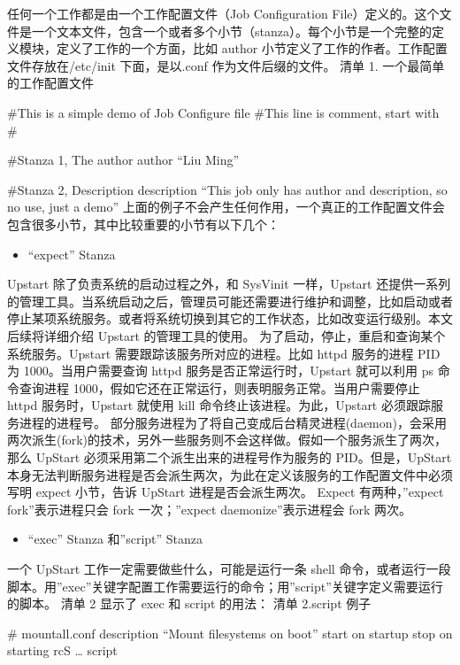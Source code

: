 \documentclass[a4paper,10pt,english]{sphinxmanual}
\begin{document}
任何一个工作都是由一个工作配置文件（Job Configuration File）定义的。这个文件是一个文本文件，包含一个或者多个小节（stanza）。每个小节是一个完整的定义模块，定义了工作的一个方面，比如 author 小节定义了工作的作者。工作配置文件存放在/etc/init 下面，是以.conf 作为文件后缀的文件。
清单 1. 一个最简单的工作配置文件

\#This is a simple demo of Job Configure file
\#This line is comment, start with \#

\#Stanza 1, The author
author “Liu Ming”

\#Stanza 2, Description
description “This job only has author and description, so no use, just a demo”
上面的例子不会产生任何作用，一个真正的工作配置文件会包含很多小节，其中比较重要的小节有以下几个：
\begin{itemize}
\item {} 
“expect” Stanza

\end{itemize}

Upstart 除了负责系统的启动过程之外，和 SysVinit 一样，Upstart 还提供一系列的管理工具。当系统启动之后，管理员可能还需要进行维护和调整，比如启动或者停止某项系统服务。或者将系统切换到其它的工作状态，比如改变运行级别。本文后续将详细介绍 Upstart 的管理工具的使用。
为了启动，停止，重启和查询某个系统服务。Upstart 需要跟踪该服务所对应的进程。比如 httpd 服务的进程 PID 为 1000。当用户需要查询 httpd 服务是否正常运行时，Upstart 就可以利用 ps 命令查询进程 1000，假如它还在正常运行，则表明服务正常。当用户需要停止 httpd 服务时，Upstart 就使用 kill 命令终止该进程。为此，Upstart 必须跟踪服务进程的进程号。
部分服务进程为了将自己变成后台精灵进程(daemon)，会采用两次派生(fork)的技术，另外一些服务则不会这样做。假如一个服务派生了两次，那么 UpStart 必须采用第二个派生出来的进程号作为服务的 PID。但是，UpStart 本身无法判断服务进程是否会派生两次，为此在定义该服务的工作配置文件中必须写明 expect 小节，告诉 UpStart 进程是否会派生两次。
Expect 有两种，”expect fork”表示进程只会 fork 一次；”expect daemonize”表示进程会 fork 两次。
\begin{itemize}
\item {} 
“exec” Stanza 和”script” Stanza

\end{itemize}

一个 UpStart 工作一定需要做些什么，可能是运行一条 shell 命令，或者运行一段脚本。用”exec”关键字配置工作需要运行的命令；用”script”关键字定义需要运行的脚本。
清单 2 显示了 exec 和 script 的用法：
清单 2.script 例子

\# mountall.conf
description “Mount filesystems on boot”
start on startup
stop on starting rcS
…
script
\end{document}
